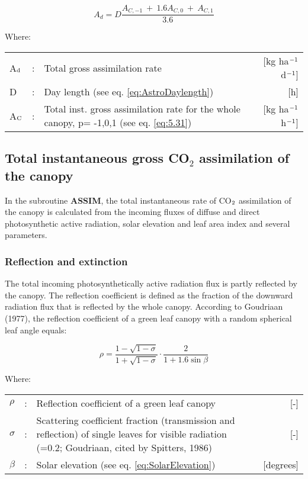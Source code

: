 \begin{equation}
\label{eq:5.11}
A_{d} = D {\frac{A_{C,-1} ~+~ 1.6 A_{C,0} ~+~ A_{C,1} }{3.6}}
\end{equation}

Where:\\[5pt]
\begin{tabularx}{\textwidth}{llXr}
	A$_{{\rm d}}$ &:& Total gross assimilation rate    &    
	[kg ha$^{{\rm -1}}$ d$^{{\rm -1}}$]\\
	D &:& Day length (see eq. \ref{eq:AstroDaylength})   &     [h]\\
	A$_{{\rm C}}$ &:& Total inst. gross assimilation rate for
	the whole canopy, p= -1,0,1 (see eq. \ref{eq:5.31})    &
	[kg ha$^{{\rm -1}}$ h$^{{\rm -1}}$]\\
\end{tabularx}

\subsection{Total instantaneous gross CO$_{2}$ assimilation of the canopy}  
\label{sec:InstantGrossAssimilation}

In the subroutine {\bf ASSIM}, the total instantaneous rate of CO$_{{\rm 2}}$ assimilation of the canopy is
calculated from the incoming fluxes of diffuse and direct photosynthetic active radiation,
solar elevation and leaf area index and several parameters.

\subsubsection{Reflection and extinction}
The total incoming photosynthetically active radiation flux is partly reflected by the
canopy. The reflection coefficient is defined as the fraction of the downward radiation
flux that is reflected by the whole canopy. According to Goudriaan (1977), the reflection
coefficient of a green leaf canopy with a random spherical leaf angle equals:

\begin{equation}
\label{eq:5.12}
\rho = {\frac{1- \sqrt{1-\sigma}}{1 + \sqrt{1-\sigma}}} \cdot {\frac{2}{1+1.6 \sin \beta }}
\end{equation}

Where:\\[5pt]
\begin{tabularx}{\textwidth}{llXr}
	$\rho$ &:& Reflection coefficient of a green leaf canopy    &    [-]\\
	$\sigma$ &:& Scattering coefficient fraction (transmission and reflection) 
	of single leaves for visible radiation   
	{\small (=0.2; Goudriaan, cited by Spitters, 1986)}  &     [-]\\  
	$\beta$ &:& Solar elevation (see eq. \ref{eq:SolarElevation})    &    [degrees]\\
\end{tabularx}

